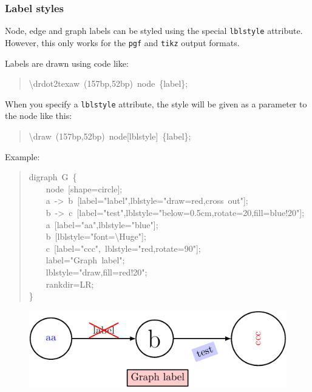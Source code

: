 \documentclass[10pt,a4paper,english]{article}
\begin{document}

\hypertarget{label-styles}{}
\subsubsection*{Label styles}
\label{label-styles}

Node, edge and graph labels can be styled using the special \texttt{lblstyle} attribute. However, this only works for the \texttt{pgf} and \texttt{tikz} output formats.

Labels are drawn using code like:
\begin{quote}{\ttfamily \raggedright \noindent
{\textbackslash}drdot2texaw~(157bp,52bp)~node~{\{}label{\}};
}\end{quote}

When you specify a \texttt{lblstyle} attribute, the style will be given as a parameter to the node like this:
\begin{quote}{\ttfamily \raggedright \noindent
{\textbackslash}draw~(157bp,52bp)~node{[}lblstyle{]}~{\{}label{\}};
}\end{quote}

Example:
\begin{quote}{\ttfamily \raggedright \noindent
digraph~G~{\{}~\\
~~~~node~{[}shape=circle{]};~\\
~~~~a~->~b~{[}label="label",lblstyle="draw=red,cross~out"{]};~\\
~~~~b~->~c~{[}label="test",lblstyle="below=0.5cm,rotate=20,fill=blue!20"{]};~\\
~~~~a~{[}label="aa",lblstyle="blue"{]};~\\
~~~~b~{[}lblstyle="font={\textbackslash}Huge"{]};~\\
~~~~c~{[}label="ccc",~lblstyle="red,rotate=90"{]};~\\
~~~~label="Graph~label";~\\
~~~~lblstyle="draw,fill=red!20";~\\
~~~~rankdir=LR;~\\
{\}}
}\end{quote}
\begin{figure}[H]
\centering

\includegraphics{pdf/lblstyle}
\end{figure}
\end{document}
